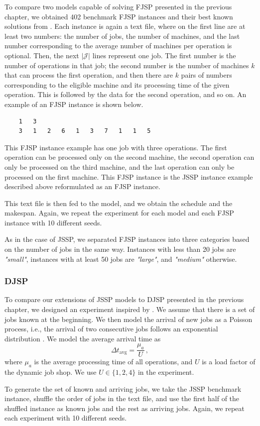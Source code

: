 To compare two models capable of solving FJSP presented in the previous chapter, we obtained 402 benchmark FJSP instances and their best known solutions from \cite{fjsp_benchmarks}. Each instance is again a text file, where on the first line are at least two numbers: the number of jobs, the number of machines, and the last number corresponding to the average number of machines per operation is optional. Then, the next $|\mathcal{J}|$ lines represent one job. The first number is the number of operations in that job; the second number is the number of machines $k$ that can process the first operation, and then there are $k$ pairs of numbers corresponding to the eligible machine and its processing time of the given operation. This is followed by the data for the second operation, and so on. An example of an FJSP instance is shown below.
\begin{verbatim}
    1   3
    3   1   2   6   1   3   7   1   1   5   
\end{verbatim}
This FJSP instance example has one job with three operations. The first operation can be processed only on the second machine, the second operation can only be processed on the third machine, and the last operation can only be processed on the first machine. This FJSP instance is the JSSP instance example described above reformulated as an FJSP instance.
\par 
This text file is then fed to the model, and we obtain the schedule and the makespan. Again, we repeat the experiment for each model and each FJSP instance with 10 different seeds.
\par
As in the case of JSSP, we separated FJSP instances into three categories based on the number of jobs in the same way. Instances with less than 20 jobs are \textit{"small"}, instances with at least 50 jobs are \textit{"large"}, and \textit{"medium"} otherwise.

\subsubsection*{DJSP}
To compare our extensions of JSSP models to DJSP presented in the previous chapter, we designed an experiment inspired by \cite{djsp_experiment_design}. We assume that there is a set of jobs known at the beginning. We then model the arrival of new jobs as a Poisson process, i.e., the arrival of two consecutive jobs follows an exponential distribution \cite{djsp_experiment_design}. We model the average arrival time as 
\begin{equation}
    \Delta t_\text{avg} = \frac{\mu_a}{U} \, ,
\end{equation}
where $\mu_a$ is the average processing time of all operations, and $U$ is a load factor of the dynamic job shop. We use $U \in \{1,2,4 \}$ in the experiment. 
\par
To generate the set of known and arriving jobs, we take the JSSP benchmark instance, shuffle the order of jobs in the text file, and use the first half of the shuffled instance as known jobs and the rest as arriving jobs. Again, we repeat each experiment with 10 different seeds.


